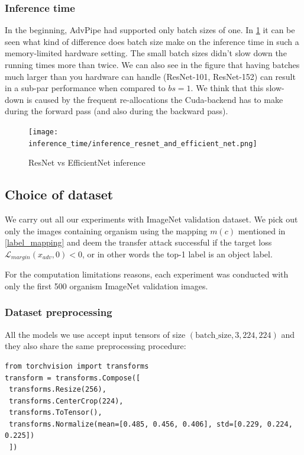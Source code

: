 \subsubsection{Inference time}
In the beginning, AdvPipe had supported only batch sizes of one. In \ref{fig:inference_time} it can be seen what kind of difference does batch size make on the inference time in such a memory-limited hardware setting. The small batch sizes didn't slow down the running times more than twice. We can also see in the figure that having batches much larger than you hardware can handle (ResNet-101, ResNet-152) can result in a sub-par performance when compared to $bs=1$. We think that this slow-down is caused by the frequent re-allocations the Cuda-backend has to make during the forward pass (and also during the backward pass).

\begin{figure}[!htb]
  \texttt{[image: inference\_time/inference\_resnet\_and\_efficient\_net.png]}
\caption{ResNet vs EfficientNet inference}
\label{fig:inference_time}
\end{figure}



\subsection{Choice of dataset}
We carry out all our experiments with ImageNet validation dataset. We pick out only the images containing organism using the mapping $m(c)$ mentioned in \ref{label_mapping} and deem the transfer attack successful if the target loss $\mathcal{L}_{margin}(x_{adv}, 0) < 0$, or in other words the top-1 label is an object label.

For the computation limitations reasons, each experiment was conducted with only the first 500 organism ImageNet validation images.

\subsubsection{Dataset preprocessing}
\label{dataset_preprocessing}
All the models we use accept input tensors of size $(\text{batch\_size}, 3, 224, 224)$ and they also share the same preprocessing procedure:
\begin{verbatim}
from torchvision import transforms
transform = transforms.Compose([
 transforms.Resize(256),
 transforms.CenterCrop(224),
 transforms.ToTensor(),
 transforms.Normalize(mean=[0.485, 0.456, 0.406], std=[0.229, 0.224, 0.225])
 ])
\end{verbatim}

